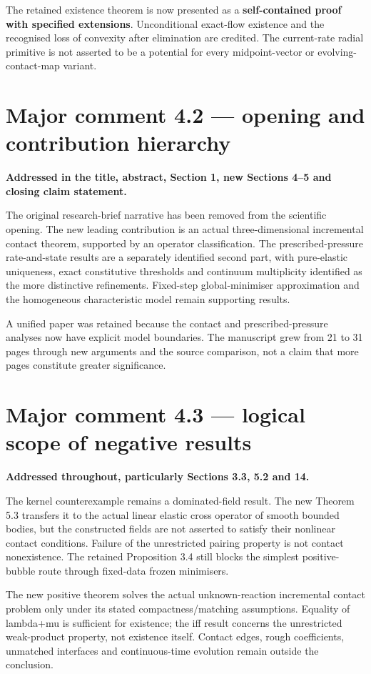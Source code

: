 \documentclass[11pt,a4paper]{article}
\begin{document}
The retained existence theorem is now presented as a \textbf{self-contained proof with specified extensions}. Unconditional exact-flow existence and the recognised loss of convexity after elimination are credited. The current-rate radial primitive is not asserted to be a potential for every midpoint-vector or evolving-contact-map variant.

\section*{Major comment 4.2 — opening and contribution hierarchy}
\textbf{Addressed in the title, abstract, Section 1, new Sections 4–5 and closing claim statement.}

The original research-brief narrative has been removed from the scientific opening. The new leading contribution is an actual three-dimensional incremental contact theorem, supported by an operator classification. The prescribed-pressure rate-and-state results are a separately identified second part, with pure-elastic uniqueness, exact constitutive thresholds and continuum multiplicity identified as the more distinctive refinements. Fixed-step global-minimiser approximation and the homogeneous characteristic model remain supporting results.

A unified paper was retained because the contact and prescribed-pressure analyses now have explicit model boundaries. The manuscript grew from 21 to 31 pages through new arguments and the source comparison, not a claim that more pages constitute greater significance.

\section*{Major comment 4.3 — logical scope of negative results}
\textbf{Addressed throughout, particularly Sections 3.3, 5.2 and 14.}

The kernel counterexample remains a dominated-field result. The new Theorem 5.3 transfers it to the actual linear elastic cross operator of smooth bounded bodies, but the constructed fields are not asserted to satisfy their nonlinear contact conditions. Failure of the unrestricted pairing property is not contact nonexistence. The retained Proposition 3.4 still blocks the simplest positive-bubble route through fixed-data frozen minimisers.

The new positive theorem solves the actual unknown-reaction incremental contact problem only under its stated compactness/matching assumptions. Equality of lambda+mu is sufficient for existence; the iff result concerns the unrestricted weak-product property, not existence itself. Contact edges, rough coefficients, unmatched interfaces and continuous-time evolution remain outside the conclusion.
\end{document}
